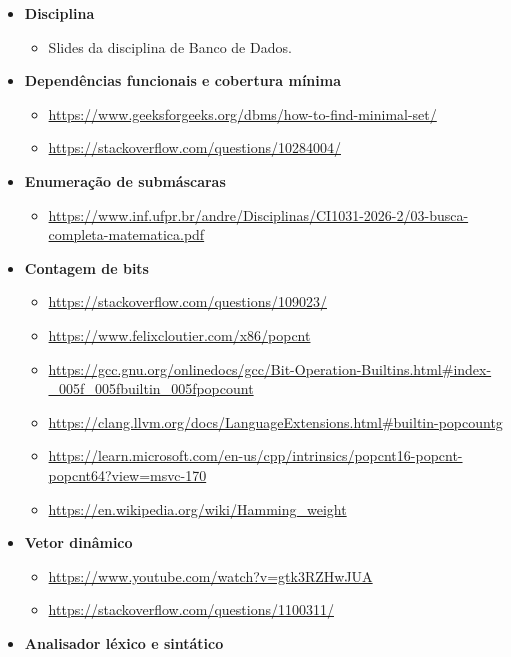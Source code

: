 \documentclass[11pt,a4paper]{article}
\begin{document}
{\small
\begin{itemize}[nosep]
    \item \textbf{Disciplina}
    \begin{itemize}[nosep]
        \item Slides da disciplina de Banco de Dados.
    \end{itemize}
    \item \textbf{Dependências funcionais e cobertura mínima}
    \begin{itemize}[nosep]
        \item \url{https://www.geeksforgeeks.org/dbms/how-to-find-minimal-set/}
        \item \url{https://stackoverflow.com/questions/10284004/}
    \end{itemize}
    \item \textbf{Enumeração de submáscaras}
    \begin{itemize}[nosep]
        \item \url{https://www.inf.ufpr.br/andre/Disciplinas/CI1031-2026-2/03-busca-completa-matematica.pdf}
    \end{itemize}
    \item \textbf{Contagem de bits}
    \begin{itemize}[nosep]
        \item \url{https://stackoverflow.com/questions/109023/}
        \item \url{https://www.felixcloutier.com/x86/popcnt}
        \item \url{https://gcc.gnu.org/onlinedocs/gcc/Bit-Operation-Builtins.html#index-_005f_005fbuiltin_005fpopcount}
        \item \url{https://clang.llvm.org/docs/LanguageExtensions.html#builtin-popcountg}
        \item \url{https://learn.microsoft.com/en-us/cpp/intrinsics/popcnt16-popcnt-popcnt64?view=msvc-170}
        \item \url{https://en.wikipedia.org/wiki/Hamming_weight}
    \end{itemize}
    \item \textbf{Vetor dinâmico}
    \begin{itemize}[nosep]
        \item \url{https://www.youtube.com/watch?v=gtk3RZHwJUA}
        \item \url{https://stackoverflow.com/questions/1100311/}
    \end{itemize}
    \item \textbf{Analisador léxico e sintático}

\end{itemize}}
\end{document}
